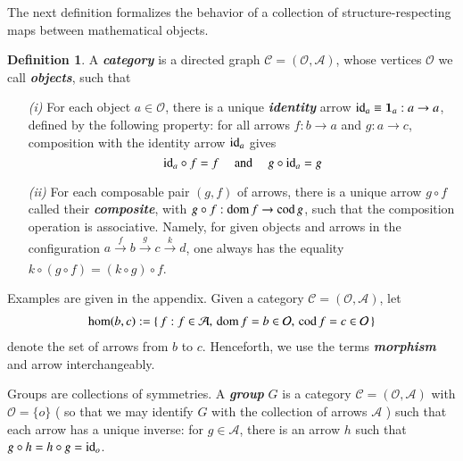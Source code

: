 \documentclass[12pt]{article}
\numberwithin{equation}{section}
\theoremstyle{definition}
\newtheorem{defn}[thm]{Definition}
\newcommand{		\dom		}	{	{\text{\rm dom\,}}		}
\newcommand{		\cod		}	{	{\text{\rm cod\,}}		}
\newcommand{		\id		}	{	{\text{\rm id}}		}
\newcommand{		\eq		}[1]	{	\begin{align*}#1\end{align*}	}%
\newcommand{		\B		}	{\textbf					} %
\newcommand{		\1		}	{	\bm{1}					}%
\begin{document}
The next definition formalizes the behavior of a collection of structure-respecting maps between mathematical objects. 


\begin{defn} A \emph{\B{category}} is a directed graph $\mathcal{C} = (\mathcal{O},\mathcal{A})$, whose vertices $\mathcal{O}$ we call \emph{\B{objects}}, such that 
\begin{itemize}
\item[\emph{(i)}] For each object $a \in \mathcal{O}$, there is a unique \emph{\B{identity}} arrow $\id_a \equiv \1_a : a \to a$, defined by the following property: for all arrows $f : b \to a$ and $g : a \to c$, composition with the identity arrow $\id_a $ gives
$$
\id_a \circ f = f \quad \text{ and } \quad g \circ \id_a = g
$$
\item[\emph{(ii)}] For each composable pair $(g, f)$ of arrows, there is a unique arrow $g \circ f$ called their \emph{\B{composite}}, with $g \circ f : \dom f \to \cod g$, such that the composition operation is associative. Namely, for given objects and arrows in the configuration $a \xrightarrow[\,]{ f} b \xrightarrow[\,]{ g} c \xrightarrow[\,]{ k} d$,
one always has the equality $k \circ (g \circ f) = (k \circ g ) \circ f$.

\end{itemize}

\end{defn}

Examples are given in the appendix. Given a category $\mathcal{C} = (\mathcal{O},\mathcal{A})$, let
\eq{
\hom (b,c) := \{ \, f : f \in \mathcal{A},  \, \dom f = b \in \mathcal{O}, \, \cod f = c \in \mathcal{O} \, \}
}
denote the set of arrows from $b$ to $c$. Henceforth, we use the terms \emph{\B{morphism}} and arrow interchangeably. 

    
     Groups are collections of symmetries. A \emph{\B{group}} $G$ is a category $\mathcal{C} = (\mathcal{O}, \mathcal{A})$ with $\mathcal{O} = \{ o \}$ ( so that we may identify $G$ with the collection of arrows $\mathcal{A}$ ) such that each arrow has a unique inverse: for $g \in \mathcal{A}$, there is an arrow $h$ such that $g \circ h = h \circ g = \id_o$. 
          
\end{document}
